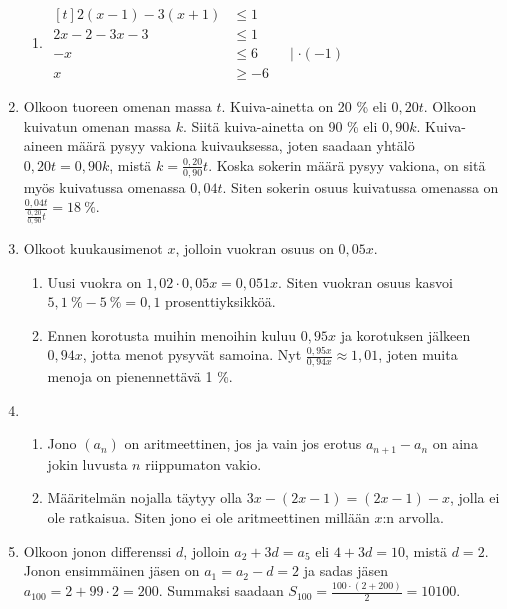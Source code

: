 \documentclass[12pt,fleqn]{article}
\begin{document}
\begin{enumerate}[label=\textbf{\arabic*.}]
\begin{enumerate}[label=\textbf{\alph*)}]
\item $\begin{aligned}[t]
    \displaystyle 
    2(x-1)-3(x+1)&\leq 1 \\
    2x-2-3x-3&\leq 1 \\
    -x&\leq 6 \qquad \mid \cdot (-1) \\
    x&\geq -6
\end{aligned}$ 
\end{enumerate}
\item Olkoon tuoreen omenan massa \(t\). Kuiva-ainetta on 20 \% eli \(0,20t\). Olkoon kuivatun omenan massa \(k\). Siitä kuiva-ainetta on 90 \% eli \(0,90k\). Kuiva-aineen määrä pysyy vakiona kuivauksessa, joten saadaan yhtälö \(0,20t=0,90k\), mistä \(\displaystyle k=\frac{0,20}{0,90}t\). Koska sokerin määrä pysyy vakiona, on sitä myös kuivatussa omenassa \(0,04t\). Siten sokerin osuus kuivatussa omenassa on \(\displaystyle \frac{0,04t}{\frac{0,20}{0,90}t}=18 \ \%\).

\item Olkoot kuukausimenot \(x\), jolloin vuokran osuus on \(0,05x\).

\begin{enumerate}[label=\textbf{\alph*)}]
\item Uusi vuokra on \(1,02\cdot 0,05x=0,051x\). Siten vuokran osuus kasvoi \(5,1 \ \%-5 \ \%=0,1\) prosenttiyksikköä.
\item Ennen korotusta muihin menoihin kuluu \(0,95x\) ja korotuksen jälkeen \(0,94x\), jotta menot pysyvät samoina. Nyt \(\displaystyle \frac{0,95x}{0,94x}\approx 1,01\), joten muita menoja on pienennettävä 1 \%.
\end{enumerate}

\item 
\begin{enumerate}[label=\textbf{\alph*)}]
\item Jono \((a_n)\) on aritmeettinen, jos ja vain jos erotus \(a_{n+1}-a_n\) on aina jokin luvusta \(n\) riippumaton vakio.

\item Määritelmän nojalla täytyy olla \(3x-(2x-1)=(2x-1)-x\), jolla ei ole ratkaisua. Siten jono ei ole aritmeettinen millään \(x\):n arvolla.
\end{enumerate}

\item Olkoon jonon differenssi \(d\), jolloin \(a_2+3d=a_5\) eli \(4+3d=10\), mistä \(d=2\). Jonon ensimmäinen jäsen on \(a_1=a_2-d=2\) ja sadas jäsen \(a_{100}=2+99\cdot 2=200\). Summaksi saadaan \(\displaystyle S_100=\frac{100\cdot (2+200)}{2}=10 100\).


\end{enumerate}
\end{document}
